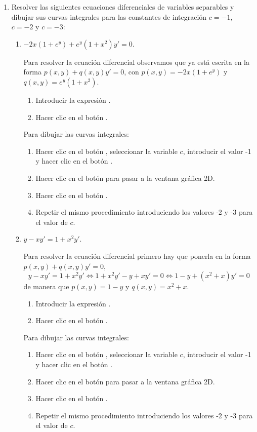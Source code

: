 \begin{enumerate}[leftmargin=*]
\item Resolver las siguientes ecuaciones diferenciales de variables separables y dibujar sus curvas integrales para las
constantes de integración $c=-1$, $c=-2$ y $c=-3$:
\begin{enumerate}
\item $-2x(1+e^y)+e^y(1+x^{2})y'=0$.
\begin{indication}
Para resolver la ecuación diferencial observamos que ya está escrita en la forma $p(x,y)+q(x,y)y'=0$, con $p(x,y)=-2x(1+e^y)$ y
$q(x,y)=e^y(1+x^{2})$.
\begin{enumerate}
\item Introducir la expresión .
\item Hacer clic en el botón .
\end{enumerate}
Para dibujar las curvas integrales:
\begin{enumerate}[resume]
\item Hacer clic en el botón , seleccionar la variable $c$, introducir el valor -1 y hacer clic en el
botón .
\item Hacer clic en el botón  para pasar a la ventana gráfica 2D.
\item Hacer clic en el botón .
\item Repetir el mismo procedimiento introduciendo los valores -2 y -3 para el valor de $c$.
\end{enumerate}
\end{indication}

\item $y-xy'=1+x^2y'$.
\begin{indication}
Para resolver la ecuación diferencial primero hay que ponerla en la forma $p(x,y)+q(x,y)y'=0$,
\[
y-xy'=1+x^2y' \Leftrightarrow 1+x^2y'-y+xy'=0 \Leftrightarrow 1-y+(x^2+x)y'=0
\]
de manera que $p(x,y)=1-y$ y $q(x,y)=x^2+x$.
\begin{enumerate}
\item Introducir la expresión .
\item Hacer clic en el botón .
\end{enumerate}
Para dibujar las curvas integrales:
\begin{enumerate}[resume]
\item Hacer clic en el botón , seleccionar la variable $c$, introducir el valor -1 y hacer clic en el
botón .
\item Hacer clic en el botón  para pasar a la ventana gráfica 2D.
\item Hacer clic en el botón .
\item Repetir el mismo procedimiento introduciendo los valores -2 y -3 para el valor de $c$.
\end{enumerate}
\end{indication}
\end{enumerate}



\end{enumerate}
